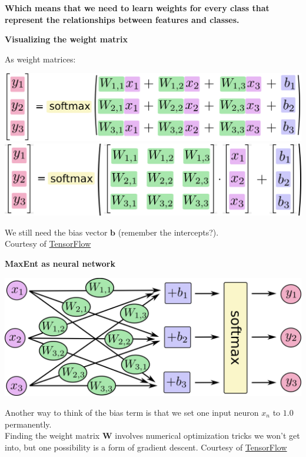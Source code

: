 \documentclass{beamer}
\newcommand{\placard}[1]{
  \begin{frame}
    \begin{center}
      \huge
      \textbf{#1}
    \end{center}
  \end{frame}
}
\newcommand{\pagestepalt}[2]{
  \begin{frame}[t]
    \begin{minipage}[t][0.26\textheight][t]{\textwidth}
      \begin{center}
        \huge
        \textbf{#1}
      \end{center}
    \end{minipage}
    
    \begin{minipage}[t][0.7\textheight][c]{\textwidth}
      #2
    \end{minipage}
  \end{frame}
}
\begin{document}
\placard{Which means that we need to learn weights \alert{for every class} that represent the relationships between features and classes.}
      
\pagestepalt{Visualizing the weight matrix}{
  As weight matrices:
  \begin{block}{}
    \begin{center}
      \includegraphics[height=0.19\textheight]{../images/softmax-regression-scalarequation.png} \\[1.1em]\pause
      \includegraphics[height=0.19\textheight]{../images/softmax-regression-vectorequation.png} \\[1.1em]
    \end{center}
  \end{block}\pause
  We still need the bias vector $\mathbf{b}$ (remember the intercepts?).\\
  {\tiny Courtesy of \href{http://www.tensorflow.org/tutorials}{TensorFlow}}
}

\pagestepalt{MaxEnt as neural network}{
  \begin{block}{}
    \begin{center}
      \includegraphics[height=0.29\textheight]{../images/softmax-regression-scalargraph.png}
    \end{center}
  \end{block}\pause
  Another way to think of the bias term is that we set one input
  neuron $x_n$ to $1.0$ permanently.\\\pause
  Finding the weight matrix $\mathbf{W}$ involves numerical optimization
  tricks we won't get into, but one possibility is a form of gradient descent.
  {\tiny Courtesy of
    \href{http://www.tensorflow.org/tutorials}{TensorFlow}}
}
\end{document}
